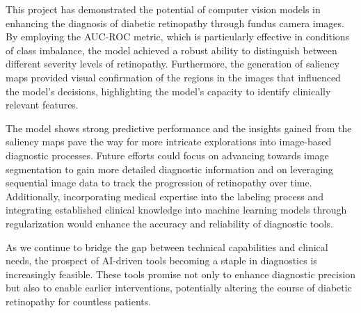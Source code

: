 This project has demonstrated the potential of computer vision models in enhancing the diagnosis of diabetic retinopathy through fundus camera images. By employing the AUC-ROC metric, which is particularly effective in conditions of class imbalance, the model achieved a robust ability to distinguish between different severity levels of retinopathy. Furthermore, the generation of saliency maps provided visual confirmation of the regions in the images that influenced the model's decisions, highlighting the model's capacity to identify clinically relevant features.

The model shows strong predictive performance and the insights gained from the saliency maps pave the way for more intricate explorations into image-based diagnostic processes. Future efforts could focus on advancing towards image segmentation to gain more detailed diagnostic information and on leveraging sequential image data to track the progression of retinopathy over time. Additionally, incorporating medical expertise into the labeling process and integrating established clinical knowledge into machine learning models through regularization would enhance the accuracy and reliability of diagnostic tools.

As we continue to bridge the gap between technical capabilities and clinical needs, the prospect of AI-driven tools becoming a staple in diagnostics is increasingly feasible. These tools promise not only to enhance diagnostic precision but also to enable earlier interventions, potentially altering the course of diabetic retinopathy for countless patients. 